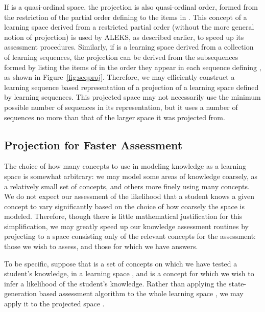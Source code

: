 \documentclass[11pt]{llncs}
\begin{document}
{If  is a quasi-ordinal space, the projection  is also quasi-ordinal order, formed from the restriction of the partial order defining  to the items in . This concept of a learning space derived from a restricted partial order (without the more general notion of projection) is used by ALEKS, as described earlier, to speed up its assessment procedures. Similarly, if  is a learning space derived from a collection of learning sequences, the projection   can be derived from the subsequences formed by listing the items of  in the order they appear in each sequence defining , as shown in Figure~\ref{fig:seqproj}. Therefore, we may efficiently construct a learning sequence based representation of a projection of a learning space defined by learning sequences. This projected space may not necessarily use the minimum possible number of sequences in its representation, but it uses a number of sequences no more than that of the larger space it was projected from.

\subsection{Projection for Faster Assessment}

The choice of how many concepts to use in modeling knowledge as a learning space is somewhat arbitrary: we may model some areas of knowledge coarsely, as a relatively small set of concepts, and others more finely using many concepts. We do not expect our assessment of the likelihood that a student knows a given concept to vary significantly based on the choice of how coarsely the space is modeled. Therefore, though there is little mathematical justification for this simplification, we may greatly speed up our knowledge assessment routines by projecting to a space consisting only of the relevant concepts for the assessment: those we wish to assess, and those for which we have answers.

To be specific, suppose that  is a set of concepts on which we have tested a student's knowledge, in a learning space , and  is a concept for which we wish to infer a likelihood of the student's knowledge.
Rather than applying the state-generation based assessment algorithm to the whole learning space , we may apply it to the projected space .

}
\end{document}
